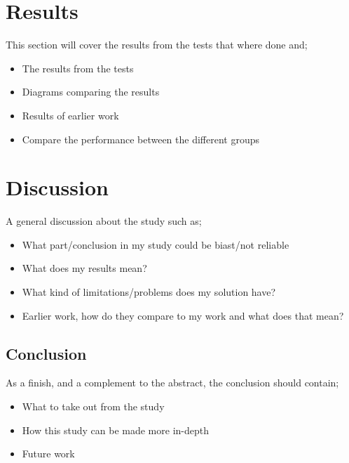 \documentclass[runningheads,a4paper,oribibl]{llncs}
\begin{document}
\section{Results}
This section will cover the results from the tests that where done and;
\begin{itemize}
	\item The results from the tests
	\item Diagrams comparing the results
	\item Results of earlier work
	\item Compare the performance between the different groups
\end{itemize}





\section{Discussion}
A general discussion about the study such as;
\begin{itemize}
	\item What part/conclusion in my study could be biast/not reliable
	\item What does my results mean?
	\item What kind of limitations/problems does my solution have?
	\item Earlier work, how do they compare to my work and what does that mean?
\end{itemize}




\subsection{Conclusion}
As a finish, and a complement to the abstract, the conclusion should contain;
\begin{itemize}
	\item What to take out from the study
	\item How this study can be made more in-depth
	\item Future work

\end{itemize}





\nocite{*}
% 



\end{document}

